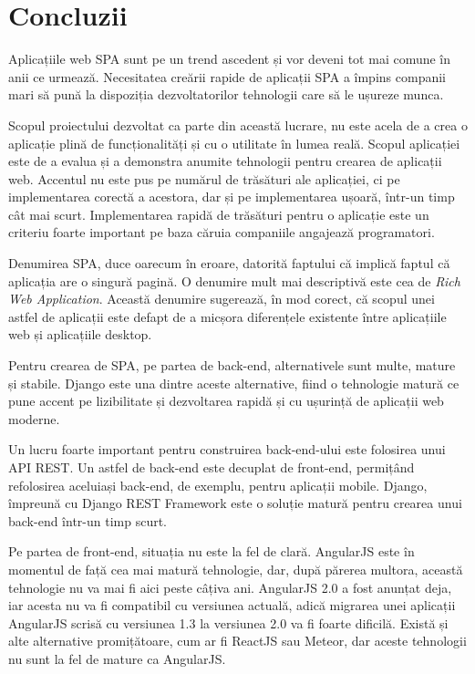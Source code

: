 \chapter{Concluzii}

Aplicațiile web SPA sunt pe un trend ascedent și vor deveni tot mai
comune în anii ce urmează. Necesitatea creării rapide de aplicații SPA
a împins companii mari să pună la dispoziția dezvoltatorilor
tehnologii care să le ușureze munca.

Scopul proiectului dezvoltat ca parte din această lucrare,
nu este acela de a crea o aplicație plină de funcționalități
și cu o utilitate în lumea reală. Scopul aplicației este
de a evalua și a demonstra anumite tehnologii pentru
crearea de aplicații web. Accentul nu este pus pe
numărul de trăsături ale aplicației, ci pe implementarea corectă
a acestora, dar și pe implementarea ușoară, într-un timp cât mai
scurt. Implementarea rapidă de trăsături pentru o aplicație
este un criteriu foarte important pe baza căruia companiile
angajează programatori.

Denumirea SPA, duce oarecum în eroare, datorită faptului
că implică faptul că aplicația are o singură pagină.
O denumire mult mai descriptivă este cea de 
\emph{Rich Web Application}. Această denumire sugerează,
în mod corect, că scopul unei astfel de aplicații este
defapt de a micșora diferențele existente între aplicațiile
web și aplicațiile desktop.

Pentru crearea de SPA, pe partea de back-end, 
alternativele sunt multe, mature și stabile.
Django este una dintre aceste alternative, fiind o tehnologie
matură ce pune accent pe lizibilitate și dezvoltarea rapidă și 
cu ușurință de aplicații web moderne.

Un lucru foarte important pentru construirea back-end-ului este
folosirea unui API REST. Un astfel de back-end este decuplat
de front-end, permițând refolosirea aceluiași back-end, de exemplu, pentru
aplicații mobile. Django, împreună cu Django REST Framework este
o soluție matură pentru crearea unui back-end într-un timp
scurt.

Pe partea de front-end, situația nu este la fel de clară. AngularJS este
în momentul de față cea mai matură tehnologie, dar, după părerea multora,
această tehnologie nu va mai fi aici peste câțiva ani.
AngularJS 2.0 a fost anunțat deja, iar acesta nu va fi compatibil
cu versiunea actuală, adică migrarea unei aplicații AngularJS scrisă
cu versiunea 1.3 la versiunea 2.0 va fi foarte dificilă. Există și alte
alternative promițătoare, cum ar fi ReactJS sau Meteor, 
dar aceste tehnologii nu sunt la fel de mature ca AngularJS.


